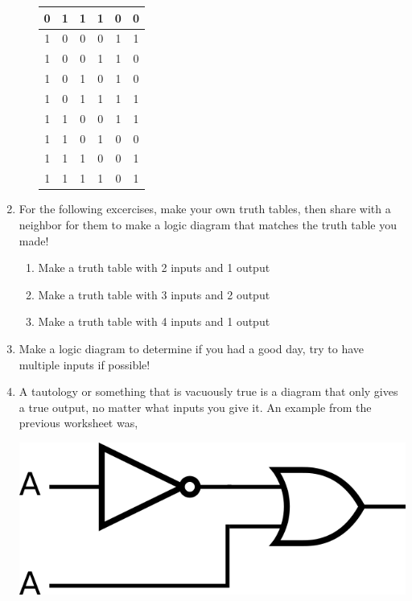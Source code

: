 \begin{enumerate}
\begin{enumerate}
\begin{tabular}{|c|c|c|c|c|c|}
                    0 & 1 & 1 & 1 & 0 & 0 \\ \hline
                    1 & 0 & 0 & 0 & 1 & 1 \\ \hline
                    1 & 0 & 0 & 1 & 1 & 0 \\ \hline
                    1 & 0 & 1 & 0 & 1 & 0 \\ \hline
                    1 & 0 & 1 & 1 & 1 & 1 \\ \hline
                    1 & 1 & 0 & 0 & 1 & 1 \\ \hline
                    1 & 1 & 0 & 1 & 0 & 0 \\ \hline
                    1 & 1 & 1 & 0 & 0 & 1 \\ \hline
                    1 & 1 & 1 & 1 & 0 & 1 \\ \hline
                \end{tabular}
        \end{enumerate}
    \item For the following excercises, make your own truth tables, then share with a neighbor for them to make a logic diagram
        that matches the truth table you made!
        \begin{enumerate}
            \item  Make a truth table with 2 inputs and 1 output
            \item  Make a truth table with 3 inputs and 2 output
            \item  Make a truth table with 4 inputs and 1 output
        \end{enumerate}
    \item Make a logic diagram to determine if you had a good day, try to have multiple inputs if possible!
    \item A tautology or something that is vacuously true is a diagram that only gives a true output, no matter what inputs you
        give it. An example from the previous worksheet was,\\
        \vspace{10mm}
        \begin{minipage}{.5\linewidth}
            \includegraphics[width=3 in]{images/tautology.png}
        \end{minipage}\\

\end{enumerate}
